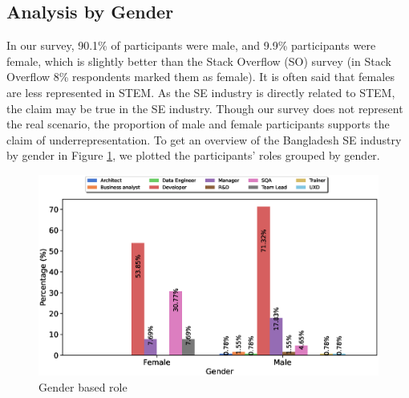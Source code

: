 \subsection{Analysis by Gender}
\label{analysis by gender}

In our survey, 90.1\% of participants were male, and 9.9\% participants were female, which is slightly better than the Stack Overflow (SO) survey\cite{StackoverflowSurvey2017,StackoverflowSurvey2018,StackoverflowSurvey2019,StackoverflowSurvey2020} (in Stack Overflow 8\% respondents marked them as female). It is often said that females are less represented in STEM. As the SE industry is directly related to STEM, the claim may be true in the SE industry. Though our survey does not represent the real scenario, the proportion of male and female participants supports the claim of underrepresentation. To get an overview of the Bangladesh SE industry by gender in Figure \ref{fig:gender and role}, we plotted the participants' roles grouped by gender. 
\begin{figure}[h]
\centering
 \includegraphics[scale=0.4]{Figures/Gender_and_Role}
 \caption{Gender based role}
 \label{fig:gender and role}
\end{figure}
